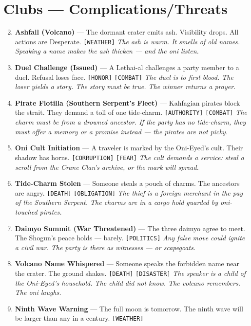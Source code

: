 \section*{Clubs --- Complications/Threats}
\label{sec:nihori-complications}
\begin{enumerate}
\setcounter{enumi}{1}
\item \textbf{Ashfall (Volcano)} --- The dormant crater emits ash. Visibility drops. All actions are Desperate. \texttt{[WEATHER]}
  \hfill \textit{The ash is warm. It smells of old names. Speaking a name makes the ash thicken --- and the oni listen.}
\item \textbf{Duel Challenge (Issued)} --- A Lethai-al challenges a party member to a duel. Refusal loses face. \texttt{[HONOR]} \texttt{[COMBAT]}
  \hfill \textit{The duel is to first blood. The loser yields a story. The story must be true. The winner returns a prayer.}
\item \textbf{Pirate Flotilla (Southern Serpent's Fleet)} --- Kahfagian pirates block the strait. They demand a toll of one tide-charm. \texttt{[AUTHORITY]} \texttt{[COMBAT]}
  \hfill \textit{The charm must be from a drowned ancestor. If the party has no tide-charm, they must offer a memory or a promise instead --- the pirates are not picky.}
\item \textbf{Oni Cult Initiation} --- A traveler is marked by the Oni-Eyed's cult. Their shadow has horns. \texttt{[CORRUPTION]} \texttt{[FEAR]}
  \hfill \textit{The cult demands a service: steal a scroll from the Crane Clan's archive, or the mark will spread.}
\item \textbf{Tide-Charm Stolen} --- Someone steals a pouch of charms. The ancestors are angry. \texttt{[DEATH]} \texttt{[OBLIGATION]}
  \hfill \textit{The thief is a foreign merchant in the pay of the Southern Serpent. The charms are in a cargo hold guarded by oni-touched pirates.}
\item \textbf{Daimyo Summit (War Threatened)} --- The three daimyo agree to meet. The Shogun's peace holds --- barely. \texttt{[POLITICS]}
  \hfill \textit{Any false move could ignite a civil war. The party is there as witnesses --- or scapegoats.}
\item \textbf{Volcano Name Whispered} --- Someone speaks the forbidden name near the crater. The ground shakes. \texttt{[DEATH]} \texttt{[DISASTER]}
  \hfill \textit{The speaker is a child of the Oni-Eyed's household. The child did not know. The volcano remembers. The oni laughs.}
\item \textbf{Ninth Wave Warning} --- The full moon is tomorrow. The ninth wave will be larger than any in a century. \texttt{[WEATHER]}

\end{enumerate}

